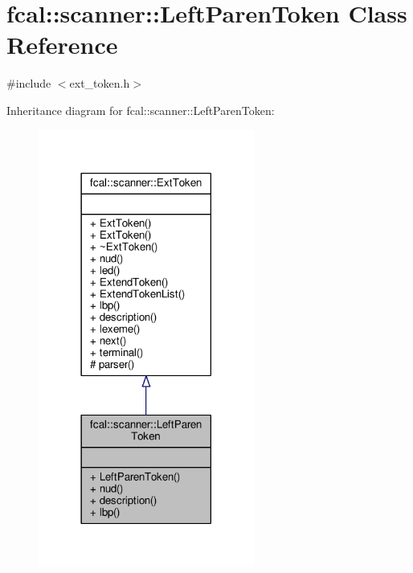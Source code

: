\hypertarget{classfcal_1_1scanner_1_1LeftParenToken}{}\section{fcal\+:\+:scanner\+:\+:Left\+Paren\+Token Class Reference}
\label{classfcal_1_1scanner_1_1LeftParenToken}


{\ttfamily \#include $<$ext\+\_\+token.\+h$>$}



Inheritance diagram for fcal\+:\+:scanner\+:\+:Left\+Paren\+Token\+:
\nopagebreak
\begin{figure}[H]
\begin{center}
\leavevmode
\includegraphics[width=201pt]{classfcal_1_1scanner_1_1LeftParenToken__inherit__graph}
\end{center}
\end{figure}


